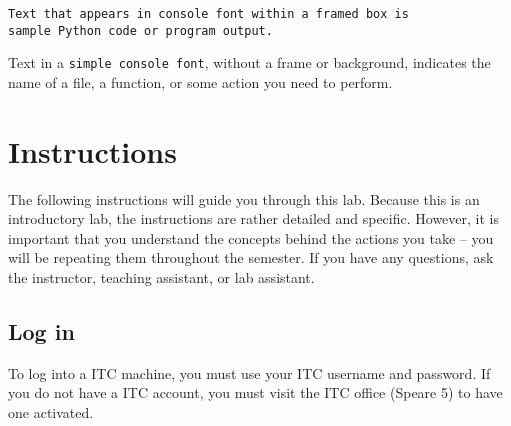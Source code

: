 \documentclass[11pt]{cselabheader}
\begin{document}
\begin{lstlisting}[style=python]
Text that appears in console font within a framed box is 
sample Python code or program output.
\end{lstlisting}

Text in a \texttt{simple console font}, without a frame or background, indicates
the name of a file, a function, or some action you need to perform.



\pagebreak
\section{Instructions}

The following instructions will guide you through this lab. Because this is an
introductory lab, the instructions are rather detailed and specific. However, it
is important that you understand the concepts behind the actions you take -- you
will be repeating them throughout the semester. If you have any questions, ask
the instructor, teaching assistant, or lab assistant.

\subsection{Log in}
To log into a ITC machine, you must use your ITC username and password. If you
do not have a ITC account, you must visit the ITC office (Speare 5) to have one
activated.
\end{document}
